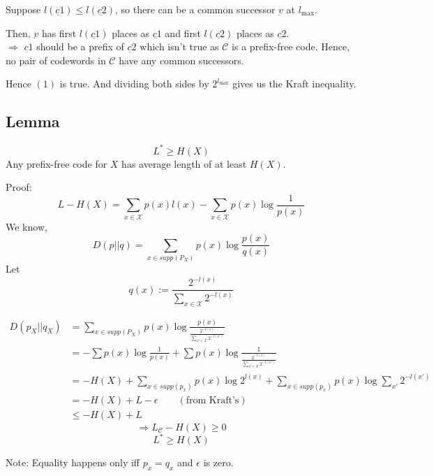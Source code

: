 \documentclass{article}
\begin{document}
Suppose $l(\underbar{c1}) \leq l(\underbar{c2})$, so there can be a common successor $\underbar{v}$ at $l_{\text{max}}$.

Then, $\underbar{v}$ has first $l(\underbar{c1})$ places as $\underbar{c1}$ and first $l(\underbar{c2})$ places as $\underbar{c2}$.\\

$\Rightarrow$ $\underbar{c1}$ should be a prefix of $\underbar{c2}$ which isn't true as $\mathscr{C}$ is a prefix-free code. Hence, no pair of codewords in $\mathscr{C}$ have any common successors.

Hence $(1)$ is true. And dividing both sides by $2^{l_{\text{max}}}$ gives us the Kraft inequality.

\subsection{Lemma}
$$ L^{*} \geq H(X)$$
Any prefix-free code for $X$ has average length of at least $H(X)$.

Proof:
$$ L - H(X) =  \sum_{x \in \mathcal{X}}p(x)l(x) - \sum_{x \in \mathcal{X}} p(x) \log \frac{1}{p(x)}$$
We know,
 $$ D(p||q)= \sum_{x \in supp(P_X)}p(x)\log \frac{p(x)}{q(x)}$$
 Let
$$ q(x):= \frac{2^{-l(x)}}{\sum_{x \in \mathcal{X}} 2^{-l(x)}}   $$

\begin{align*}
    D(p_X || q_X) &= \sum_{x \in supp(P_X)}p(x)\log \frac{p(x)}{\frac{2^{-l(x)}}{\sum_{x' \in \mathcal{X}} 2^{-l(x')}}} \\
    &= - \sum p(x) \log \frac{1}{p(x)} + \sum p(x) \log \frac{1}{\frac{2^{-l(x)}}{\sum_{x' \in \mathcal{X}} 2^{-l(x')}}} \\
    &= -H(X) + \sum_{x \in supp(p_x)} p(x) \log 2^{l(x)} + \sum_{x \in supp(p_x)} p(x) \log \sum_{x'} 2^{-l(x')}  \\
    &= -H(X)+ L - \epsilon \qquad (\text{from Kraft's})\\
    & \leq - H(X)+L
\end{align*}
$$ \Rightarrow L_{\mathscr{C}} - H(X) \geq 0$$
 $$ L^{*} \geq H(X)$$

 Note: Equality happens only iff $p_x = q_x$ and $\epsilon$ is zero.
\end{document}
